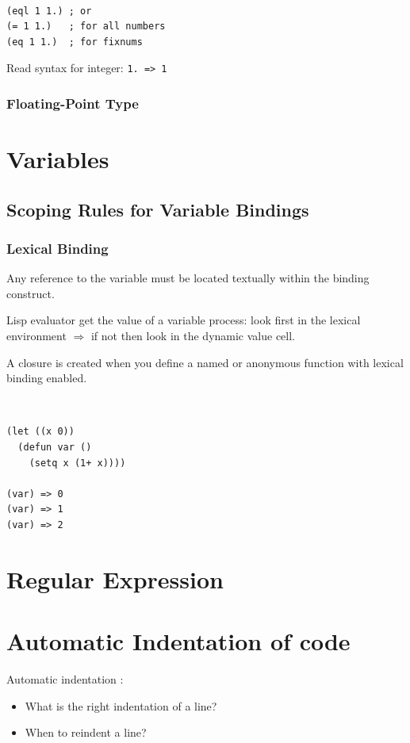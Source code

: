 \documentclass{article}
\begin{document}
\begin{example}[compare]~
    \begin{verbatim}
(eql 1 1.) ; or
(= 1 1.)   ; for all numbers
(eq 1 1.)  ; for fixnums
\end{verbatim}
\end{example}

Read syntax for integer: \verb|1. => 1|

\subsubsection{Floating-Point Type}

\section{Variables}
\subsection{Scoping Rules for Variable Bindings}
\subsubsection{Lexical Binding}
\begin{definition}
    Any reference to the variable must be located textually within the binding construct.
\end{definition}

Lisp evaluator get the value of a variable process:
look first in the lexical environment $\Rightarrow$ if not then look in the dynamic value cell.

\begin{definition}[closure]
    A closure is created when you define a named or anonymous function with lexical binding enabled.
\end{definition}

\begin{example}~
    \begin{verbatim}
(let ((x 0))
  (defun var ()
    (setq x (1+ x))))

(var) => 0
(var) => 1
(var) => 2
\end{verbatim}
\end{example}

\section{Regular Expression}

\section{Automatic Indentation of code}
Automatic indentation \cite{LEWIS_1998_GNU_EMACS_LISP_REFERENCE_MANUAL}:
\begin{itemize}
    \item What is the right indentation of a line?
    \item When to reindent a line?
\end{itemize}
\end{document}
